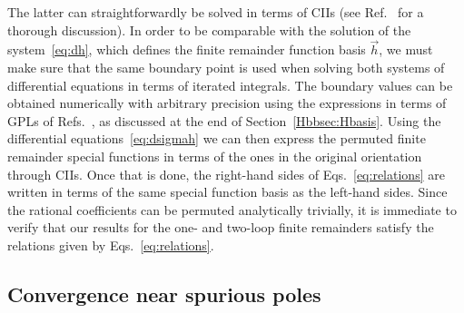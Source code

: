 \documentclass[main.tex]{subfiles}
\begin{document}
The latter can straightforwardly be solved in terms of CIIs (see Ref.~\cite{Badger:2021nhg} for a thorough discussion). In order to be comparable with the solution of the system~\eqref{eq:dh}, which defines the finite remainder function basis $\vec{h}$, we must make sure that the same boundary point is used when solving both systems of differential equations in terms of iterated integrals. The boundary values can be obtained numerically with arbitrary precision using the expressions in terms of GPLs of Refs.~\cite{Papadopoulos:2015jft,Syrrakos:2020kba,Canko:2020ylt}, as discussed at the end of Section~\ref{Hbbsec:Hbasis}. Using the differential equations~\eqref{eq:dsigmah} we can then express the permuted finite remainder special functions in terms of the ones in the original orientation through CIIs. Once that is done, the right-hand sides of Eqs.~\eqref{eq:relations} are written in terms of the same special function basis as the left-hand sides. Since the rational coefficients can be permuted analytically trivially, it is immediate to verify that our results for the one- and two-loop finite remainders satisfy the relations given by Eqs.~\eqref{eq:relations}.




\subsection{Convergence near spurious poles}
\end{document}
